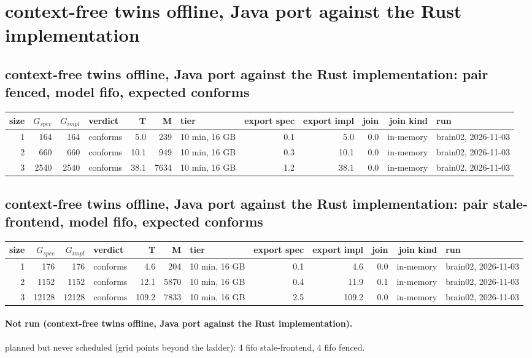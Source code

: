 \documentclass[10pt]{article}
\begin{document}
\section*{context-free twins offline, Java port against the Rust implementation}
\subsection*{context-free twins offline, Java port against the Rust implementation: pair \textsf{fenced}, model fifo, expected conforms}
\begin{longtable}{@{}rrrlrrlrrrrl@{}}
\toprule
size & $G_{\mathit{spec}}$ & $G_{\mathit{impl}}$ & verdict & T & M & tier & export spec & export impl & join & join kind & run \\
\midrule
\endhead
\color{red} 1 & 164 & 164 & conforms & 5.0 & 239 & 10 min, 16 GB & 0.1 & 5.0 & 0.0 & in-memory & brain02, 2026-11-03 \\
\color{red} 2 & 660 & 660 & conforms & 10.1 & 949 & 10 min, 16 GB & 0.3 & 10.1 & 0.0 & in-memory & brain02, 2026-11-03 \\
\color{red} 3 & 2540 & 2540 & conforms & 38.1 & 7634 & 10 min, 16 GB & 1.2 & 38.1 & 0.0 & in-memory & brain02, 2026-11-03 \\
\bottomrule
\end{longtable}
\subsection*{context-free twins offline, Java port against the Rust implementation: pair \textsf{stale-frontend}, model fifo, expected conforms}
\begin{longtable}{@{}rrrlrrlrrrrl@{}}
\toprule
size & $G_{\mathit{spec}}$ & $G_{\mathit{impl}}$ & verdict & T & M & tier & export spec & export impl & join & join kind & run \\
\midrule
\endhead
\color{red} 1 & 176 & 176 & conforms & 4.6 & 204 & 10 min, 16 GB & 0.1 & 4.6 & 0.0 & in-memory & brain02, 2026-11-03 \\
\color{red} 2 & 1152 & 1152 & conforms & 12.1 & 5870 & 10 min, 16 GB & 0.4 & 11.9 & 0.1 & in-memory & brain02, 2026-11-03 \\
\color{red} 3 & 12128 & 12128 & conforms & 109.2 & 7833 & 10 min, 16 GB & 2.5 & 109.2 & 0.0 & in-memory & brain02, 2026-11-03 \\
\bottomrule
\end{longtable}
\paragraph{Not run (context-free twins offline, Java port against the Rust implementation).}
planned but never scheduled (grid points beyond the ladder): 4 fifo stale-frontend, 4 fifo fenced.\par
\end{document}
